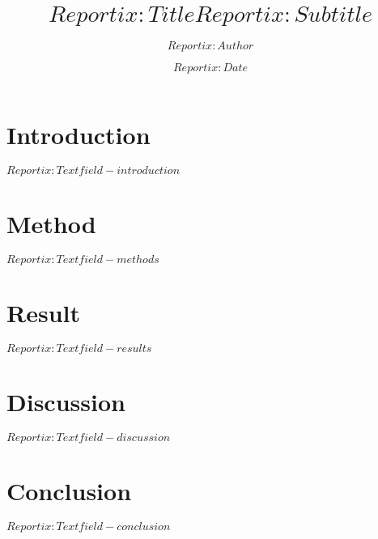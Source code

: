 \documentclass{scrreprt}
\title{$Reportix:Title$}
\title{$Reportix:Subtitle$}
\author{$Reportix:Author$}
\date{$Reportix:Date$}
\begin{document}
\maketitle
\section*{Introduction}
$Reportix:Textfield-introduction$
\section*{Method}
$Reportix:Textfield-methods$
\section*{Result}
$Reportix:Textfield-results$
\section*{Discussion}
$Reportix:Textfield-discussion$
\section*{Conclusion}
$Reportix:Textfield-conclusion$
\end{document}
